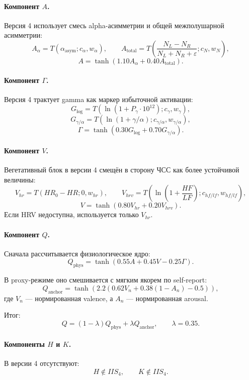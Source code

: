 \documentclass[12pt,a4paper]{article}
\begin{document}
\paragraph{Компонент $A$.}
Версия 4 использует смесь alpha-асимметрии и общей межполушарной асимметрии:
\[
A_\alpha = T(\alpha_{\mathrm{asym}}; c_\alpha, w_\alpha),
\qquad
A_{\mathrm{total}} = T\!\left(\frac{N_L-N_R}{N_L+N_R+\varepsilon}; c_N, w_N\right),
\]
\[
A = \tanh\!\left(1.10A_\alpha + 0.40A_{\mathrm{total}}\right).
\]

\paragraph{Компонент $\Gamma$.}
Версия 4 трактует gamma как маркер избыточной активации:
\[
G_{\log} = T\!\left(\ln(1+P_\gamma \cdot 10^{12}); c_\gamma, w_\gamma\right),
\]
\[
G_{\gamma/\alpha} = T\!\left(\ln(1+\gamma/\alpha); c_{\gamma/\alpha}, w_{\gamma/\alpha}\right),
\]
\[
\Gamma = \tanh\!\left(0.30G_{\log} + 0.70G_{\gamma/\alpha}\right).
\]

\paragraph{Компонент $V$.}
Вегетативный блок в версии 4 смещён в сторону ЧСС как более устойчивой величины:
\[
V_{hr} = T(HR_0 - HR; 0, w_{hr}),
\qquad
V_{hrv} = T\!\left(\ln\!\left(1+\frac{HF}{LF}\right); c_{hf/lf}, w_{hf/lf}\right),
\]
\[
V = \tanh\!\left(0.80V_{hr} + 0.20V_{hrv}\right).
\]
Если HRV недоступна, используется только $V_{hr}$.

\paragraph{Компонент $Q$.}
Сначала рассчитывается физиологическое ядро:
\[
Q_{\mathrm{phys}} = \tanh\!\left(0.55A + 0.45V - 0.25\Gamma\right).
\]

В proxy-режиме оно смешивается с мягким якорем по self-report:
\[
Q_{\mathrm{anchor}}=
\tanh\!\left(
2.2\left(0.62V_n + 0.38(1-A_n) - 0.5\right)
\right),
\]
где $V_n$ --- нормированная valence, а $A_n$ --- нормированная arousal.

Итог:
\[
Q = (1-\lambda)Q_{\mathrm{phys}} + \lambda Q_{\mathrm{anchor}},
\qquad
\lambda = 0.35.
\]

\paragraph{Компоненты $H$ и $K$.}
В версии 4 отсутствуют:
\[
H \notin IIS_4,
\qquad
K \notin IIS_4.
\]
\end{document}
